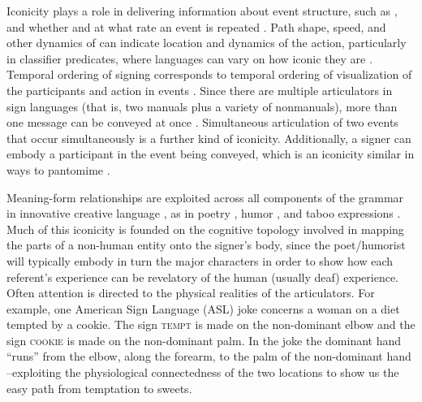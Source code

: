 \documentclass[output=paper,
modfonts
]{LSP/langsci}
\begin{document}
Iconicity plays a role in delivering information about event structure,
such as  \citep{wilbur2003,wilbur2008,wilbur2008,strickland2015,schlenker2016n}, and whether and at what rate an event is
repeated \citep{kuhn2016}. Path shape, speed, and other
dynamics of  can indicate location and dynamics of the action,
particularly in classifier predicates, where languages can vary on how
iconic they are \citep{aronoff2003,tumtavitikul2009}. Temporal ordering of signing corresponds to temporal ordering of
visualization of the participants and action in events \citep{napolisuttonspence2014,napoli-forthcoming}.
Since there are multiple articulators in sign languages (that is, two
manuals plus a variety of nonmanuals), more than one message can be
conveyed at once \citep{vermeerbergen2007,napoli2010}. Simultaneous articulation of two events that occur
simultaneously is a further kind of iconicity. Additionally, a signer
can embody a participant in the event being conveyed, which is an
iconicity similar in ways to pantomime \citep{metzger2001}.

Meaning-form relationships are exploited across all components of the
grammar in innovative creative language \citep{sutton2016},
as in poetry \citep{bauman2006,sutton2010,sutton2013}, humor \citep{sutton2009}, and taboo expressions \citep{mirus2012,napoli2013}. Much of this iconicity is founded on the
cognitive topology involved in mapping the parts of a non-human entity
onto the signer's body, since the poet/humorist will typically embody in
turn the major characters in order to show how each referent's
experience can be revelatory of the human (usually deaf) experience.
Often attention is directed to the physical realities of the
articulators. For example, one American Sign Language (ASL) joke
concerns a woman on a diet tempted by a cookie. The sign \textsc{tempt}
is made on the non-dominant elbow and the sign \textsc{cookie} is made
on the non-dominant palm. In the joke the dominant hand ``runs'' from
the elbow, along the forearm, to the palm of the non-dominant hand
--exploiting the physiological connectedness of the two locations to
show us the easy path from temptation to sweets.
\end{document}
